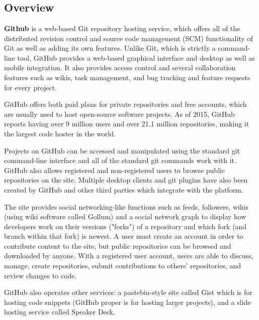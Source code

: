 \documentclass{article}\usepackage[]{graphicx}\usepackage[]{color}
\begin{document}
\section*{}
\subsection*{}

\subsection*{Overview}
\textbf{Github} is a web-based Git repository hosting service, which offers all of the distributed revision control and source code management (SCM) functionality of Git as well as adding its own features. Unlike Git, which is strictly a command-line tool, GitHub provides a web-based graphical interface and desktop as well as mobile integration. It also provides access control and several collaboration features such as wikis, task management, and bug tracking and feature requests for every project.
\smallskip
\par GitHub offers both paid plans for private repositories and free accounts, which are usually used to host open-source software projects. As of 2015, GitHub reports having over 9 million users and over 21.1 million repositories, making it the largest code hoster in the world. \smallskip
\par Projects on GitHub can be accessed and manipulated using the standard git command-line interface and all of the standard git commands work with it. GitHub also allows registered and non-registered users to browse public repositories on the site. Multiple desktop clients and git plugins have also been created by GitHub and other third parties which integrate with the platform. \smallskip
\par The site provides social networking-like functions such as feeds, followers, wikis (using wiki software called Gollum) and a social network graph to display how developers work on their versions ("forks") of a repository and which fork (and branch within that fork) is newest. \smallskip
A user must create an account in order to contribute content to the site, but public repositories can be browsed and downloaded by anyone. With a registered user account, users are able to discuss, manage, create repositories, submit contributions to others' repositories, and review changes to code. \smallskip
\par GitHub also operates other services: a pastebin-style site called Gist which is for hosting code snippets (GitHub proper is for hosting larger projects), and a slide hosting service called Speaker Deck. \smallskip
\end{document}
